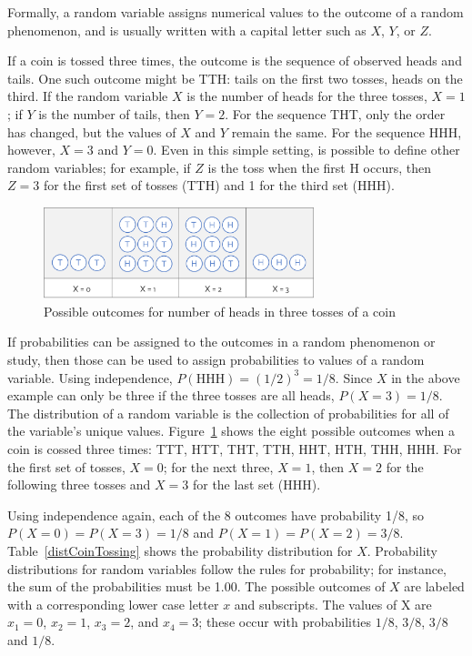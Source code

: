 Formally, a random variable assigns numerical values to the outcome of a random phenomenon, and is usually written with a capital letter such as $X$, $Y$, or $Z$. 

If a coin is tossed three times, the outcome is the sequence of observed heads and tails. One such outcome might be TTH: tails on the first two tosses, heads on the third. If the random variable $X$ is the number of heads for the three tosses, $X=1$; if $Y$ is the number of tails, then $Y=2$. For the sequence THT, only the order has changed, but the values of $X$ and $Y$ remain the same. For the sequence HHH, however, $X=3$ and $Y=0$. Even in this simple setting, is possible to define other random variables; for example, if $Z$ is the toss when the first H occurs, then $Z=3$ for the first set of tosses (TTH) and 1 for the third set (HHH).  

\begin{figure}[h]
	\centering
	\includegraphics[width=0.70\textwidth]
	{ch_distributions_oi_biostat/figures/coinToss/coinToss.png}
	\caption{Possible outcomes for number of heads in three tosses of a coin}
	\label{coinToss}
\end{figure}

If probabilities can be assigned to the outcomes in a random phenomenon or study, then those can be used to assign probabilities to values of a random variable.  Using independence, $P(\text{HHH}) = (1/2)^3 = 1/8$.  Since $X$ in the above example can only be three if the three tosses are all heads, $P(X=3) = 1/8$.  The distribution of a random variable is the collection of probabilities for all of the variable's unique values. Figure~\ref{coinToss} shows the eight possible outcomes when a coin is cossed three times: TTT, HTT, THT, TTH, HHT, HTH, THH, HHH. For the first set of tosses, $X = 0$; for the next three, $X=1$, then $X=2$ for the following three tosses and $X=3$ for the last set (HHH).  

Using independence again, each of the 8 outcomes have probability 1/8, so $P(X = 0) = P(X = 3) = 1/8$ and $P(X = 1) = P(X = 2) = 3/8$. Table~\ref{distCoinTossing} shows the probability distribution for $X$.  Probability distributions for random variables follow the rules for probability; for instance, the sum of the probabilities must be 1.00.  The possible outcomes of $X$ are labeled with a corresponding lower case letter $x$ and subscripts.  The values of X are $x_1=0$, $x_2=1$,  $x_3 = 2$, and $x_4 = 3$; these occur with probabilities $1/8$, $3/8$, $3/8$ and $1/8$.

